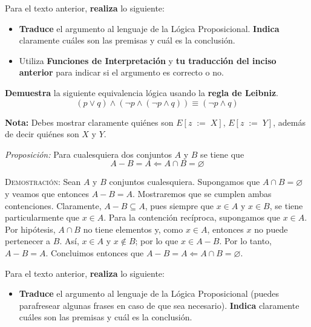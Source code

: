 \documentclass[oneside]{style}
\begin{document}
\begin{questions}[label=\protect\circled{\bfseries\arabic*}]
{        Para el texto anterior, \textbf{realiza} lo siguiente:
        \begin{itemize}
            \item \textbf{Traduce} el argumento al lenguaje de la Lógica 
            Proposicional. \textbf{Indica} claramente cuáles son las premisas y
            cuál es la conclusión. 
            
            \item Utiliza \textbf{Funciones de Interpretación} y \textbf{tu 
            traducción del inciso anterior} para indicar si el argumento es 
            correcto o no. 
        \end{itemize}

    } 

    \question
    {
        \textbf{Demuestra} la siguiente equivalencia lógica usando la 
        \textbf{regla de Leibniz}.
        \begin{equation*}
            (p \lor q) \land (\neg p \land (\neg p \land q)) \equiv 
            (\neg p \land q)
        \end{equation*}
    }

    \textbf{Nota:} Debes mostrar claramente quiénes son $E[z \; := \; X]$, 
    $E[z \; := \; Y]$, además de decir quiénes son $X$ y $Y$. 

    \newpage
    \question
    {
        \textit{Proposición:} Para cualesquiera dos conjuntos $A$ y $B$ se tiene 
        que 
        \begin{equation*}
            A - B = A \Leftarrow A \cap B = \varnothing
        \end{equation*}

        \textsc{Demostración}: Sean $A$ y $B$ conjuntos cualesquiera. 
        Supongamos que $A \cap B = \varnothing$ y veamos que entonces 
        $A - B = A$. Mostraremos que se cumplen ambas contenciones. Claramente, 
        $A - B \subseteq A$, pues siempre que $x \in A$ y $x \in B$, se tiene 
        particularmente que $x \in A$. Para la contención recíproca, supongamos 
        que $x \in A$. Por hipótesis, $A \cap B$ no tiene elementos y, como $x \in A$, entonces $x$ no 
        puede pertenecer a $B$. Así, $x \in A$ y $x \notin B$; por lo que 
        $x \in A - B$. Por lo tanto, $A - B = A$. Concluimos entonces que 
        $A - B = A \Leftarrow A \cap B = \varnothing$.

        \vspace*{5mm}

        Para el texto anterior, \textbf{realiza} lo siguiente:
        \begin{itemize}
            \item \textbf{Traduce} el argumento al lenguaje de la Lógica 
            Proposicional (puedes parafresear algunas frases en caso de que sea 
            necesario). \textbf{Indica} claramente cuáles son las premisas y
            cuál es la conclusión.
            

\end{itemize}}
\end{questions}
\end{document}
